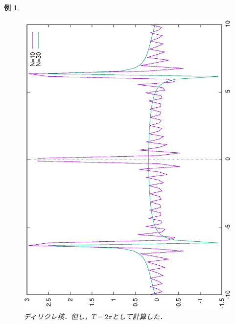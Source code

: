 \documentclass[a4j]{jsbook}
\newtheorem{example}[theorem]{例}
\numberwithin{theorem}{chapter}  %
\begin{document}
\begin{example}
\begin{figure}
    \includegraphics[angle=-90, width=\linewidth]{A3-2.eps}
    \caption{ディリクレ核．但し，\(T=2\pi\)として計算した．}
    \label{fig2-8}
\end{figure}
\end{example}
\end{document}
